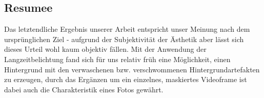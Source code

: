 \documentclass[12pt]{scrartcl}
\begin{document}
\subsection{Resumee}
Das letztendliche Ergebnis unserer Arbeit entspricht unser Meinung nach dem urspr\"unglichen Ziel - aufgrund der Subjektivit\"at der
\"Asthetik aber l\"asst sich dieses Urteil wohl kaum objektiv f\"allen. Mit der Anwendung der Langzeitbelichtung fand sich f\"ur uns relativ
fr\"uh eine M\"oglichkeit, einen Hintergrund mit den verwaschenen bzw. verschwommenen Hintergrundartefakten zu erzeugen, durch das Erg\"anzen um ein einzelnes, maskiertes Videoframe ist dabei auch die Charakteristik eines Fotos gewährt.
\end{document}
